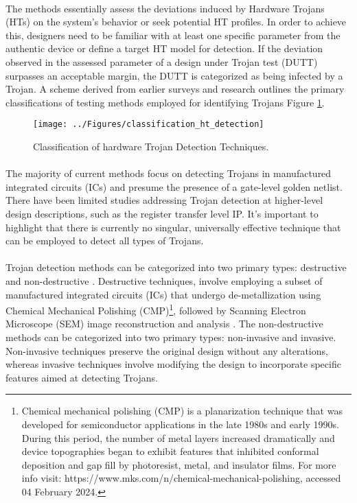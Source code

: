 \paragraph*{}
The methods essentially assess the deviations induced by Hardware Trojans (HTs) on the system's behavior or seek potential HT profiles. In order to achieve this, designers need to be familiar with at least one specific parameter from the authentic device or define a target HT model for detection. If the deviation observed in the assessed parameter of a design under Trojan test (DUTT) surpasses an acceptable margin, the DUTT is categorized as being infected by a Trojan. A scheme derived from earlier surveys and research outlines the primary classifications of testing methods employed for identifying Trojans Figure \ref{fig:classificationhtdetection}.
\begin{figure}[h]
	\centering
	\texttt{[image: ../Figures/classification\_ht\_detection]}
	\caption{Classification of hardware Trojan Detection Techniques.}
	\label{fig:classificationhtdetection}
\end{figure}

\paragraph*{}
The majority of current methods focus on detecting Trojans in manufactured integrated circuits (ICs) and presume the presence of a gate-level golden netlist. There have been limited studies addressing Trojan detection at higher-level design descriptions, such as the register transfer level IP. It's important to highlight that there is currently no singular, universally effective technique that can be employed to detect all types of Trojans.
\paragraph*{}
Trojan detection methods can be categorized into two primary types: destructive and non-destructive \cite{tehranipoor2011introduction}. Destructive techniques, involve employing a subset of manufactured integrated circuits (ICs) that undergo de-metallization using Chemical Mechanical Polishing (CMP)\footnote{Chemical mechanical polishing (CMP) is a planarization technique that was developed for semiconductor applications in the late 1980s and early 1990s. During this period, the number of metal layers increased dramatically and device topographies began to exhibit features that inhibited conformal deposition and gap fill by photoresist, metal, and insulator films. For more info visit: https://www.mks.com/n/chemical-mechanical-polishing, accessed 04 February 2024.}, followed by Scanning Electron Microscope (SEM) image reconstruction and analysis \cite{8741031}. The non-destructive methods can be categorized into two primary types: non-invasive and invasive. Non-invasive techniques preserve the original design without any alterations, whereas invasive techniques involve modifying the design to incorporate specific features aimed at detecting Trojans.
